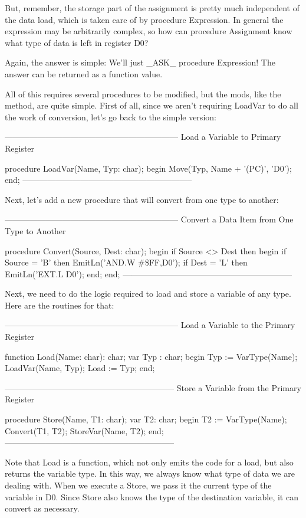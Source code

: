 \documentclass[float=false, crop=false]{standalone}
\begin{document}
But, remember, the storage part of the assignment is pretty much independent of
the data load, which is taken care of by procedure Expression. In general the
expression may be arbitrarily complex, so how can procedure Assignment know what
type of data is left in register D0?

Again, the answer is simple: We'll just _ASK_ procedure Expression! The answer
can be returned as a function value.

All of this requires several procedures to be modified, but the mods, like the
method, are quite simple. First of all, since we aren't requiring LoadVar to do
all the work of conversion, let's go back to the simple version:


{---------------------------------------------------------------}
{ Load a Variable to Primary Register }

procedure LoadVar(Name, Typ: char);
begin
   Move(Typ, Name + '(PC)', 'D0');
end;
{--------------------------------------------------------------}


Next, let's add a new procedure that will convert from one type to another:


{---------------------------------------------------------------}
{ Convert a Data Item from One Type to Another }


procedure Convert(Source, Dest: char);
begin
   if Source <> Dest then begin
      if Source  = 'B' then
         EmitLn('AND.W #\$FF,D0');
      if Dest = 'L' then
         EmitLn('EXT.L D0');
   end;
end;
{--------------------------------------------------------------}


Next, we need to do the logic required to load and store a variable of any type.
Here are the routines for that:


{---------------------------------------------------------------}
{ Load a Variable to the Primary Register }

function Load(Name: char): char;
var Typ : char;
begin
   Typ := VarType(Name);
   LoadVar(Name, Typ);
   Load := Typ;
end;


{--------------------------------------------------------------}
{ Store a Variable from the Primary Register }

procedure Store(Name, T1: char);
var T2: char;
begin
   T2 := VarType(Name);
   Convert(T1, T2);
   StoreVar(Name, T2);
end;
{--------------------------------------------------------------}


Note that Load is a function, which not only emits the code for a load, but also
returns the variable type. In this way, we always know what type of data we are
dealing with. When we execute a Store, we pass it the current type of the
variable in D0. Since Store also knows the type of the destination variable, it
can convert as necessary.
\end{document}
